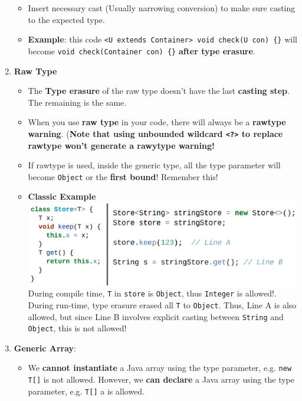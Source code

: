 \documentclass[10pt, landscape]{article}
\begin{document}
\begin{multicols}{4}
\begin{enumerate}
\begin{itemize}
\begin{itemize}
        \end{itemize}
        \item Insert necessary cast (Usually narrowing conversion) to make sure casting to the expected type.
        \item \textbf{Example}: this code \texttt{<U extends Container> void check(U con) \{\}} will become \texttt{void check(Container con) \{\}} \textbf{after type erasure}.
    \end{itemize}
    \item \textbf{Raw Type}
    \begin{itemize}
        \item The \textbf{Type erasure} of the raw type doesn't have the last \textbf{casting step}. The remaining is the same.
        \item When you use \textbf{raw type} in your code, there will always be a \textbf{rawtype warning}. (\textbf{Note that using unbounded wildcard \texttt{<?>} to replace rawtype won't generate a rawytype warning!}
        \item If rawtype is used, inside the generic type, all the type parameter will become \texttt{Object} or the \textbf{first bound}! Remember this!
        \item \textbf{Classic Example} \\
        \includegraphics[width=1\linewidth]{Paper/Midterm/images/midterm-5.png} \\
        During compile time, \texttt{T} in \texttt{store} is \texttt{Object}, thus \texttt{Integer} is allowed!. During run-time, type erasure erased all \texttt{T} to \texttt{Object}. Thus, Line A is also allowed, but since Line B involves explicit casting between \texttt{String} and \texttt{Object}, this is not allowed!
    \end{itemize}
    \item \textbf{Generic Array}:
    \begin{itemize}
        \item We \textbf{cannot instantiate} a Java array using the type parameter, e.g. \texttt{new T[]} is not allowed. However, we \textbf{can declare} a Java array using the type parameter, e.g. \texttt{T[]} a is allowed.

\end{itemize}
\end{enumerate}
\end{multicols}
\end{document}
